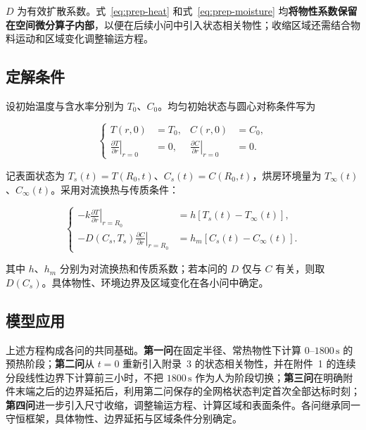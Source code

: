 $D$ 为有效扩散系数。式~\eqref{eq:prep-heat} 和式~\eqref{eq:prep-moisture} 均\textbf{将物性系数保留在空间微分算子内部}，以便在后续小问中引入状态相关物性；收缩区域还需结合物料运动和区域变化调整输运方程。

\subsection{定解条件}

设初始温度与含水率分别为 $T_0$、$C_0$。均匀初始状态与圆心对称条件写为

\begin{equation}
\left\{
\begin{aligned}
T(r,0)&=T_0,& C(r,0)&=C_0,\\
\left.\frac{\partial T}{\partial r}\right|_{r=0}&=0,
&
\left.\frac{\partial C}{\partial r}\right|_{r=0}&=0.
\end{aligned}
\right.
\label{eq:prep-initial-center}
\end{equation}

记表面状态为 $T_s(t)=T(R_0,t)$、$C_s(t)=C(R_0,t)$，烘房环境量为 $T_\infty(t)$、$C_\infty(t)$。采用对流换热与传质条件：

\begin{equation}
\left\{
\begin{aligned}
-k\left.\frac{\partial T}{\partial r}\right|_{r=R_0}
&=h\left[T_s(t)-T_\infty(t)\right],\\
-D(C_s,T_s)\left.\frac{\partial C}{\partial r}\right|_{r=R_0}
&=h_m\left[C_s(t)-C_\infty(t)\right].
\end{aligned}
\right.
\label{eq:prep-surface}
\end{equation}

其中 $h$、$h_m$ 分别为对流换热和传质系数；若本问的 $D$ 仅与 $C$ 有关，则取 $D(C_s)$。具体物性、环境边界及区域变化在各小问中确定。

\subsection{模型应用}

上述方程构成各问的共同基础。\textbf{第一问}在固定半径、常热物性下计算 $0$--$1800\,\mathrm{s}$ 的预热阶段；\textbf{第二问}从 $t=0$ 重新引入附录~3 的状态相关物性，并在附件~1 的连续分段线性边界下计算前三小时，不把 $1800\,\mathrm{s}$ 作为人为阶段切换；\textbf{第三问}在明确附件末端之后的边界延拓后，利用第二问保存的全网格状态判定首次全部达标时刻；\textbf{第四问}进一步引入尺寸收缩，调整输运方程、计算区域和表面条件。各问继承同一守恒框架，具体物性、边界延拓与区域条件分别确定。
